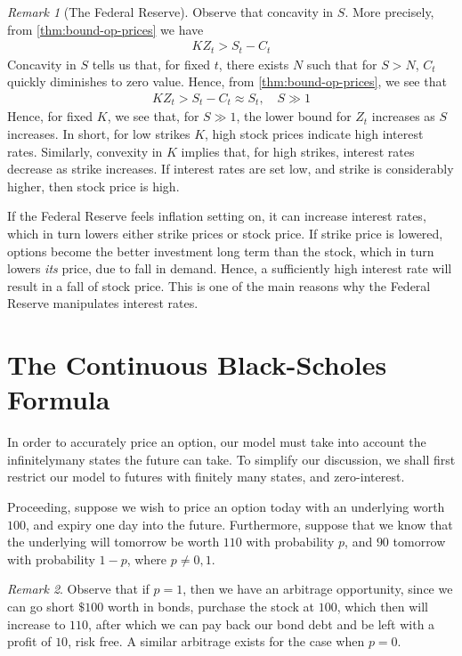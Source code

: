 \documentclass[12pt]{article}
\theoremstyle{plain}
\theoremstyle{definition}
\theoremstyle{remark}
\newtheorem*{remark}{Remark}
\numberwithin{equation}{section}  %
\begin{document}
\begin{remark}[The Federal Reserve]
	Observe that concavity in $S$. More precisely, from
	\cref{thm:bound-op-prices} we have
	\begin{equation*}
		\begin{split}
			KZ_{t} > S_{t} - C_{t}
		\end{split}
	\end{equation*}
	Concavity in $S$ tells us that, for fixed $t$, there exists $N$ such that for
	$S > N$, $C_{t}$ quickly diminishes to zero value. Hence, from
	\cref{thm:bound-op-prices}, we see that
	\begin{equation*}
		\begin{split}
			KZ_{t} > S_{t} - C_{t} \approx S_{t}, \quad S \gg 1
		\end{split}
	\end{equation*}
	Hence, for fixed $K$, we see that, for $S \gg 1$, the lower bound for $Z_{t}$
	increases as $S$ increases.  In short, for low strikes $K$, high stock prices
	indicate high interest rates. Similarly, convexity in $K$ implies that, for
	high strikes, interest rates decrease as strike increases. If interest rates
	are set low, and strike is considerably higher, then stock price is high.

	If the Federal Reserve feels inflation setting on, it can increase interest
	rates,
	which in turn lowers either strike prices or stock price.  If strike price is
	lowered, options become the better investment long term than the stock, which
	in turn lowers \emph{its} price, due to fall in demand. Hence, a sufficiently
	high interest rate will result in a fall of stock price. This is one of the
	main reasons why the Federal Reserve manipulates interest rates.
\end{remark}
\section{The Continuous Black-Scholes Formula}
In order to accurately price an option, our model must take into account the infinitelymany states the future can take. To simplify our discussion, we shall first restrict our model to futures with finitely many states, and zero-interest. 

Proceeding, suppose we wish to price an option today with an underlying worth $100$,
and expiry one day into the future. Furthermore, suppose that we know
that the underlying will tomorrow be worth $110$ with probability $p$,
and $90$ tomorrow with probability $1-p$, where $p \neq 0,1$. 
\begin{remark}
	Observe that if $p=1$, then we have an arbitrage opportunity, since
	we can go short $\$100$ worth in bonds, purchase the stock at $100$, which then will increase to $110$, after which we can pay back our bond debt and be left with 
	a profit of $10$, risk free. A similar arbitrage exists for the case when $p=0$.
\end{remark}
\end{document}
